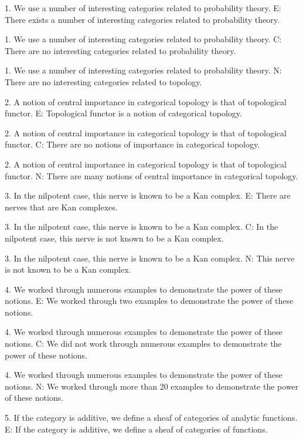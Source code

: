 
1. We use a number of interesting categories related to probability theory.
E: There exists a number of interesting categories related to probability theory.

1. We use a number of interesting categories related to probability theory.
C: There are no interesting categories related to probability theory.

1. We use a number of interesting categories related to probability theory.
N: There are no interesting categories related to topology.

2. A notion of central importance in categorical topology is that of topological functor.
E: Topological functor is a notion of categorical topology.

2. A notion of central importance in categorical topology is that of topological functor.
C: There are no notions of importance in categorical topology.

2. A notion of central importance in categorical topology is that of topological functor.
N: There are many  notions of central importance in categorical topology.

3. In the nilpotent case, this nerve is known to be a Kan complex.
E: There are nerves that are Kan complexes.

3. In the nilpotent case, this nerve is known to be a Kan complex.
C: In the nilpotent case, this nerve is not known to be a Kan complex.

3. In the nilpotent case, this nerve is known to be a Kan complex.
N: This nerve is not known to be a Kan complex.

4. We worked through numerous examples to demonstrate the power of these notions.
E: We worked through two examples to demonstrate the power of these notions.

4. We worked through numerous examples to demonstrate the power of these notions.
C: We did not work through numerous examples to demonstrate the power of these notions.

4. We worked through numerous examples to demonstrate the power of these notions.
N: We worked through more than 20 examples to demonstrate the power of these notions.

5. If the category is additive, we define a sheaf of categories of analytic functions.
E: If the category is additive, we define a sheaf of categories of functions.

